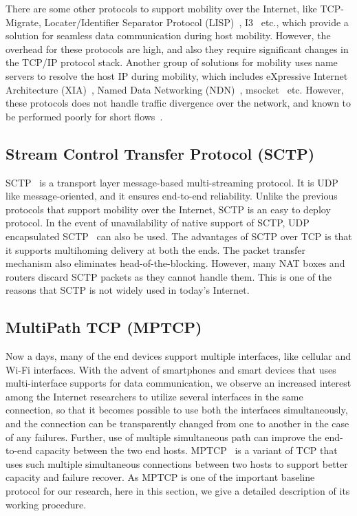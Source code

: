 There are some other protocols to support mobility over the Internet, like TCP-Migrate, Locater/Identifier Separator Protocol (LISP)~\cite{LISPRFC6830}, I3~\cite{I3-internet-indirection-infrastructure} etc., which provide a solution for seamless data communication during host mobility. However, the overhead for these protocols are high, and also they require significant changes in the TCP/IP protocol stack. Another group of solutions for mobility uses name servers to resolve the host IP during mobility, which includes eXpressive Internet Architecture (XIA)~\cite{XIA}, Named Data Networking (NDN)~\cite{ndn}, msocket~\cite{Yadav2016} etc. However, these protocols does not handle traffic divergence over the network, and known to be performed poorly for short flows~\cite{dukkipati2006flow}.

\subsection{Stream Control Transfer Protocol (SCTP)}
SCTP~\cite{RFC4960} is a transport layer message-based multi-streaming protocol. It is UDP like message-oriented, and it ensures end-to-end reliability. Unlike the previous protocols that support mobility over the Internet, SCTP is an easy to deploy protocol. In the event of unavailability of native support of SCTP, UDP encapsulated SCTP~\cite{RFC6951} can also be used. The advantages of SCTP over TCP is that it supports multihoming delivery at both the ends. The packet transfer mechanism also eliminates head-of-the-blocking. However, many NAT boxes and routers discard SCTP packets as they cannot handle them. This is one of the reasons that SCTP is not widely used in today's Internet.

\subsection{MultiPath TCP (MPTCP)}
Now a days, many of the end devices support multiple interfaces, like cellular and Wi-Fi interfaces. With the advent of smartphones and smart devices that uses multi-interface supports for data communication, we observe an increased interest among the Internet researchers to utilize several interfaces in the same connection, so that it becomes possible to use both the interfaces simultaneously, and the connection can be transparently changed from one to another in the case of any failures. Further, use of multiple simultaneous path can improve the end-to-end capacity between the two end hosts. MPTCP~\cite{mptcpsurvey} is a variant of TCP that uses such multiple simultaneous connections between two hosts to support better capacity and failure recover. As MPTCP is one of the important baseline protocol for our research, here in this section, we give a detailed description of its working procedure. 


